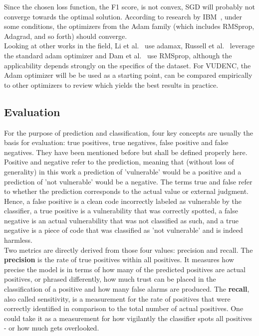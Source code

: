 \documentclass[
a4paper,
pagesize,
pdftex,
12pt,
twoside, %
BCOR=5mm, %
ngerman,
fleqn,
final,
]{scrartcl}
\begin{document}
	Since the chosen loss function, the F1 score, is not convex, SGD will probably not converge towards the optimal solution. According to research by IBM~\cite{IBMResearchEditorialStaff.6.5.2019}, under some conditions, the optimizers from the Adam family (which includes RMSprop, Adagrad, and so forth) should converge.\\
	Looking at other works in the field, Li et al.~\cite{Li.2018} use adamax, Russell et al.~\cite{Russell.2018} leverage the standard adam optimizer and Dam et al.~\cite{Dam.2017} use RMSprop, although the applicability depends strongly on the specifics of the dataset. For VUDENC, the Adam optimizer will be be used as a starting point, can be compared empirically to other optimizers to review which yields the best results in practice.
	
	\subsection{Evaluation}\label{Evaluation}
	For the purpose of prediction and classification, four key concepts are usually the basis for evaluation: true positives, true negatives, false positive and false negatives. They have been mentioned before but shall be defined properly here. Positive and negative refer to the prediction, meaning that (without loss of generality) in this work a prediction of 'vulnerable' would be a positive and a prediction of 'not vulnerable' would be a negative. The terms true and false refer to whether the prediction corresponds to the actual value or external judgment. Hence, a false positive is a clean code incorrectly labeled as vulnerable by the classifier, a true positive is a vulnerability that was correctly spotted, a false negative is an actual vulnerability that was not classified as such, and a true negative is a piece of code that was classified as 'not vulnerable' and is indeed harmless.\\
	Two metrics are directly derived from those four values: precision and recall. The \textbf{precision} is the rate of true positives within all positives. It measures how precise the model is in terms of how many of the predicted positives are actual positives, or phrased differently, how much trust can be placed in the classification of a positive and how many false alarms are produced. The \textbf{recall}, also called sensitivity, is a measurement for the rate of positives that were correctly identified in comparison to the total number of actual positives. One could take it as a measurement for how vigilantly the classifier spots all positives - or how much gets overlooked.\newline
\end{document}
